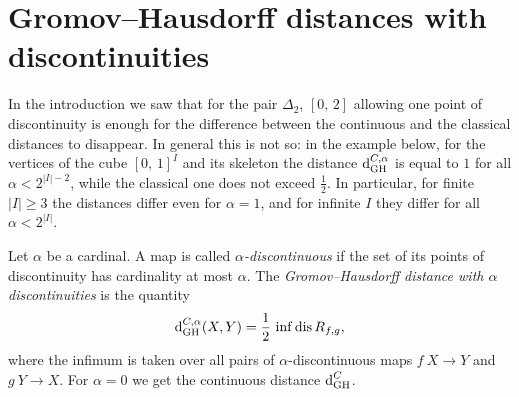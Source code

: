 \section{Gromov--Hausdorff distances with discontinuities}\label{sec: appendix}

  In the introduction we saw that for the pair $\Delta_2$, $[0,\, 2]$ allowing one point of discontinuity is enough for the difference between the continuous and the classical distances to disappear.
  In general this is not so: in the example below, for the vertices of the cube ${[0,\, 1]}^I$ and its skeleton the distance $\operatorname{d}^{C,\alpha}_{\mathrm{GH}}$ is equal to $1$ for all $\alpha < 2^{|I|-2}$, while the classical one does not exceed $\frac12$.
  In particular, for finite $|I| \ge 3$ the distances differ even for $\alpha = 1$, and for infinite $I$ they differ for all $\alpha < 2^{|I|}$.

  \begin{define}\label{def: dGH C n}
    Let $\alpha$ be a cardinal.
    A map is called \emph{$\alpha$-discontinuous} if the set of its points of discontinuity has cardinality at most $\alpha$.
    The \emph{Gromov--Hausdorff distance with $\alpha$ discontinuities} is the quantity
    $$
    \operatorname{d}^{C,\alpha}_{\mathrm{GH}}(X,Y)=\frac12\,\inf \operatorname{dis} R_{f,g},
    $$
    where the infimum is taken over all pairs of $\alpha$-discontinuous maps $f \: X \to Y$ and $g \: Y \to X$.
    For $\alpha = 0$ we get the continuous distance $\operatorname{d}^{C}_{\mathrm{GH}}$.
  \end{define}

